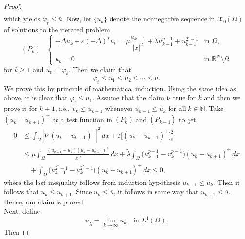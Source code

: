 \documentclass[11pt]{article}
\newcommand{\ntrl}{\mathbb{N}}
\newcommand{\X}{\mathcal{X}_0} %
\begin{document}
\begin{proof}
\begin{equation*}
\begin{aligned}
\end{aligned}
\end{equation*}
which yields $\varphi_t \leq \bar u$. Now, let \(\{u_k\}\) denote the nonnegative sequence in \(\X(\Omega)\) of solutions to the iterated problem
\begin{equation*}
(P_k) \; \; \; 
\begin{cases}
-\Delta u_k + \varepsilon (-\Delta)^s u_k = \mu \dfrac{u_{k-1}}{|x|^2} + \tilde\lambda u_{k-1}^{p-1} + u_{k-1}^{2^*-1} & \text{in } \Omega, \\[8pt]
u_k = 0 & \text{in } \mathbb{R}^N \setminus \Omega
\end{cases}
\end{equation*}
for $k \geq 1$ and $u_0 = \varphi_t$. Then we claim that
\[
\varphi_t \leq u_1 \leq u_2 \leq \cdots \leq \overline{u} .
\]
We prove this by principle of mathematical induction. Using the same idea as above, it is clear that \(\varphi_t \leq u_1\). Assume that the claim is true for $k$ and then we prove it for $k+1$, i.e., $u_{k} \leq u_{k+1}$ whenever $u_{k-1} \leq u_k$ for all $k \in \ntrl$. Take \((u_{k} - u_{k+1})^+\) as a test function in \((P_k)\) and \((P_{k+1})\) to get 
\begin{equation*}
\begin{aligned}
0 &\leq \int_{\Omega} |\nabla (u_{k} - u_{k+1})^+|^2 \, dx 
+ \varepsilon \big[ (u_{k} - u_{k+1})^+ \big]^2_{s} \\[6pt]
&\leq \mu \int_{\Omega} \frac{(u_{k-1} - u_{k})(u_{k} - u_{k+1})^+}{|x|^2} \, dx + \tilde\lambda \int_{\Omega} \big(u_{k-1}^{p-1} - u_{k}^{p-1}\big) (u_{k} - u_{k+1})^+ \, dx \\[6pt]
&\quad + \int_{\Omega} \big(u_{k-1}^{2^*-1} - u_{k}^{2^*-1}\big)(u_{k} - u_{k+1})^+ \, dx \leq 0,
\end{aligned}
\end{equation*}
where the last inequality follows from induction hypothesis \(u_{k-1} \leq u_{k}\). Then it follows that $u_{k} \leq u_{k+1}$.
Since \(u_{k} \leq \overline{u}\), it follows in same way that $u_{k+1} \leq \overline{u}$. Hence, our claim is proved. \\
Next, define
\[
u_{\tilde\lambda} = \lim_{k \to \infty} u_k \quad \text{in } L^1(\Omega).
\]
Then 


\end{proof}
\end{document}
